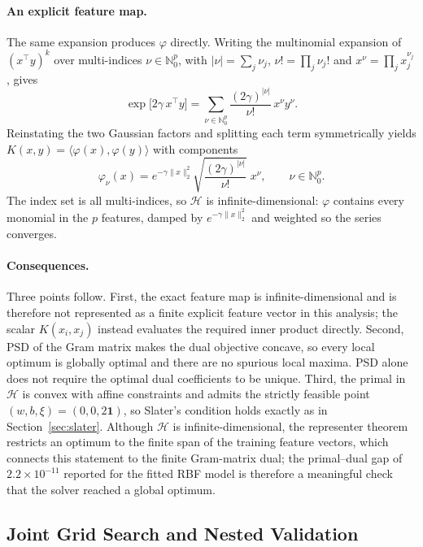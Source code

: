 \documentclass[11pt,a4paper]{article}
\numberwithin{equation}{section} %
\begin{document}
\paragraph{An explicit feature map.}
The same expansion produces $\varphi$ directly. Writing the multinomial
expansion of $(x^\top y)^k$ over multi-indices
$\nu\in\mathbb{N}_0^{p}$, with $\lvert\nu\rvert=\sum_j\nu_j$,
$\nu!=\prod_j\nu_j!$ and $x^\nu=\prod_jx_j^{\nu_j}$, gives
\begin{equation}
    \exp\bigl[2\gamma\,x^\top y\bigr]
    =\sum_{\nu\in\mathbb{N}_0^{p}}
      \frac{(2\gamma)^{\lvert\nu\rvert}}{\nu!}\,x^\nu y^\nu .
\end{equation}
Reinstating the two Gaussian factors and splitting each term symmetrically
yields $K(x,y)=\langle\varphi(x),\varphi(y)\rangle$ with components
\begin{equation}
    \varphi_\nu(x)=e^{-\gamma\lVert x\rVert_2^2}
    \sqrt{\frac{(2\gamma)^{\lvert\nu\rvert}}{\nu!}}\;x^\nu,
    \qquad \nu\in\mathbb{N}_0^{p}.
\end{equation}
The index set is all multi-indices, so $\mathcal H$ is
infinite-dimensional: $\varphi$ contains every monomial in the $p$ features,
damped by $e^{-\gamma\lVert x\rVert_2^2}$ and weighted so the series converges.

\paragraph{Consequences.}
Three points follow. First, the exact feature map is infinite-dimensional and
is therefore not represented as a finite explicit feature vector in this
analysis; the scalar $K(x_i,x_j)$ instead evaluates the required inner product
directly. Second, PSD of the Gram matrix makes the dual objective concave, so
every local optimum is globally optimal and there are no spurious local
maxima. PSD alone does not require the optimal dual coefficients to be unique.
Third, the primal in $\mathcal H$ is convex with affine constraints and admits
the strictly feasible point
$(w,b,\xi)=(0,0,2\mathbf{1})$, so Slater's condition holds exactly as in
Section~\ref{sec:slater}. Although $\mathcal H$ is infinite-dimensional, the
representer theorem restricts an optimum to the finite span of the training
feature vectors, which connects this statement to the finite Gram-matrix dual;
the primal--dual gap of $2.2\times10^{-11}$ reported
for the fitted RBF model is therefore a meaningful check that the solver
reached a global optimum.

\subsection{Joint Grid Search and Nested Validation}
\end{document}
